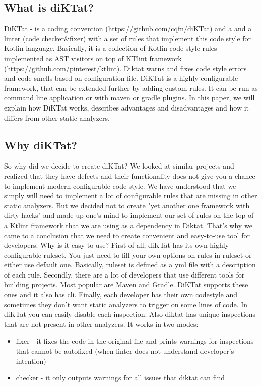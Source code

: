 \subsection{What is diKTat?}
DiKTat - is a coding convention (\url{https://github.com/cqfn/diKTat}) and a and a linter (code checker&fixer) with a set of rules that implement this code style for Kotlin language. Basically, it is a collection of Kotlin code style rules implemented as AST visitors on top of KTlint framework (\url{https://github.com/pinterest/ktlint}). Diktat warns and fixes code style errors and code smells based on configuration file. DiKTat is a highly configurable framework, that can be extended further by adding custom rules. It can be run as command line application or with maven or gradle plugins. In this paper, we will explain how DiKTat works, describes advantages and disadvantages and how it differs from other static analyzers.

\subsection{Why diKTat?}
So why did we decide to create diKTat? We looked at similar projects and realized that they have defects and their functionality does not give you a chance to implement modern configurable code style. We have understood that we simply will need to implement a lot of configurable rules that are missing in other static analyzers. But we decided not to create "yet another one framework with dirty hacks" and made up one's mind to implement our set of rules on the top of a Ktlint framework that we are using as a dependency in Diktat. That’s why we came to a conclusion that we need to create convenient and easy-to-use tool for developers. Why is it easy-to-use? First of all, diKTat has its own highly configurable ruleset. You just need to fill your own options on rules in ruleset or either use default one. Basically, ruleset is defined as a yml file with a description of each rule. Secondly, there are a lot of developers that use different tools for building projects. Most popular are Maven and Gradle. DiKTat supports these ones and it also has cli. Finally, each developer has their own codestyle and sometimes they don’t want static analyzers to trigger on some lines of code. In diKTat you can easily disable each inspection. Also diktat has unique inspections that are not present in other analyzers. It works in two modes:
\begin{itemize}
\item fixer - it fixes the code in the original file and prints warnings for inspections that cannot be autofixed (when linter does not understand developer's intention)
\item checker - it only outputs warnings for all issues that diktat can find
\end{itemize}